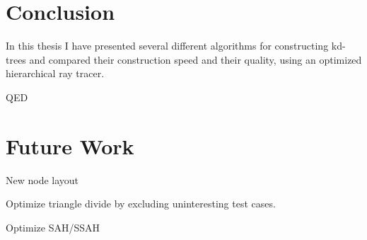 




\chapter{Conclusion}



In this thesis I have presented several different algorithms for constructing
kd-trees and compared their construction speed and their quality, using an
optimized hierarchical ray tracer.




QED








\chapter{Future Work}\label{chp:future}


New node layout

Optimize triangle divide by excluding uninteresting test cases.

Optimize SAH/SSAH





